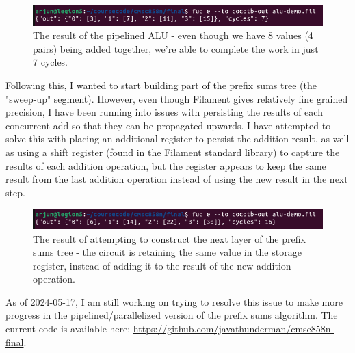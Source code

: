 \documentclass[12pt]{article}
\begin{document}
\begin{figure}[H]
    \centering
    \includegraphics[width=\linewidth]{images/alu_result.png}
    \caption{The result of the pipelined ALU - even though we have 8 values (4 pairs) being added together, we're able to complete the
    work in just 7 cycles.}
\end{figure}

Following this, I wanted to start building part of the prefix sums tree (the "sweep-up" segment). However, even though Filament gives
relatively fine grained precision, I have been running into issues with persisting the results of each concurrent add so that they can be
propagated upwards. I have attempted to solve this with placing an additional register to persist the addition result, as well as using a
shift register (found in the Filament standard library) to capture the results of each addition operation, but the register appears to keep the
same result from the last addition operation instead of using the new result in the next step.

\begin{figure}[H]
    \centering
    \includegraphics[width=\linewidth]{images/alu_result_doubled.png}
    \caption{The result of attempting to construct the next layer of the prefix sums tree - the circuit is retaining the same value in
    the storage register, instead of adding it to the result of the new addition operation.}
\end{figure}

As of 2024-05-17, I am still working on trying to resolve this issue to make more progress in the pipelined/parallelized version of
the prefix sums algorithm. The current code is available here: \url{https://github.com/javathunderman/cmsc858n-final}.
\clearpage
\nocite{*}
\printbibliography
\end{document}
